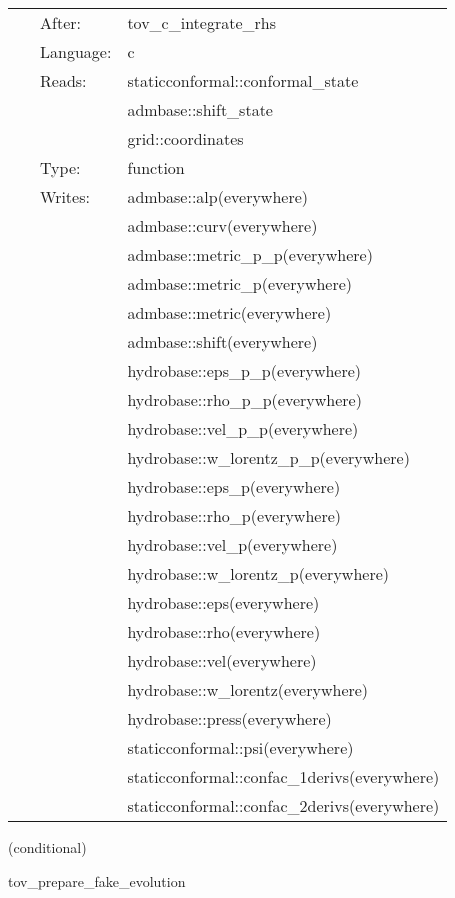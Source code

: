  \begin{tabular*}{160mm}{cll} 
~ & After:  & tov\_c\_integrate\_rhs \\ 
~ & Language:  & c \\ 
~ & Reads:  & staticconformal::conformal\_state \\ 
~& ~ &admbase::shift\_state\\ 
~& ~ &grid::coordinates\\ 
~ & Type:  & function \\ 
~ & Writes:  & admbase::alp(everywhere) \\ 
~& ~ &admbase::curv(everywhere)\\ 
~& ~ &admbase::metric\_p\_p(everywhere)\\ 
~& ~ &admbase::metric\_p(everywhere)\\ 
~& ~ &admbase::metric(everywhere)\\ 
~& ~ &admbase::shift(everywhere)\\ 
~& ~ &hydrobase::eps\_p\_p(everywhere)\\ 
~& ~ &hydrobase::rho\_p\_p(everywhere)\\ 
~& ~ &hydrobase::vel\_p\_p(everywhere)\\ 
~& ~ &hydrobase::w\_lorentz\_p\_p(everywhere)\\ 
~& ~ &hydrobase::eps\_p(everywhere)\\ 
~& ~ &hydrobase::rho\_p(everywhere)\\ 
~& ~ &hydrobase::vel\_p(everywhere)\\ 
~& ~ &hydrobase::w\_lorentz\_p(everywhere)\\ 
~& ~ &hydrobase::eps(everywhere)\\ 
~& ~ &hydrobase::rho(everywhere)\\ 
~& ~ &hydrobase::vel(everywhere)\\ 
~& ~ &hydrobase::w\_lorentz(everywhere)\\ 
~& ~ &hydrobase::press(everywhere)\\ 
~& ~ &staticconformal::psi(everywhere)\\ 
~& ~ &staticconformal::confac\_1derivs(everywhere)\\ 
~& ~ &staticconformal::confac\_2derivs(everywhere)\\ 
\end{tabular*} 


\vspace{5mm}

\noindent {\bf }   (conditional) 

\hspace{5mm} tov\_prepare\_fake\_evolution 


